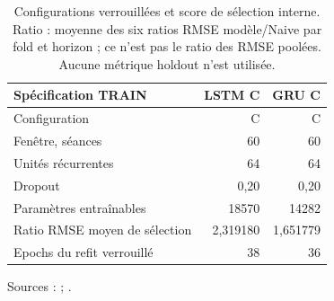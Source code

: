 \begin{table}[!htbp]
\centering
\caption{Configurations verrouillées et score de sélection interne. Ratio : moyenne des six ratios RMSE modèle/Naive par fold et horizon ; ce n'est pas le ratio des RMSE poolées. Aucune métrique holdout n'est utilisée.}
\label{tab:neural_comparison}
\small
\setlength{\tabcolsep}{4pt}
\renewcommand{\arraystretch}{1.16}
\begin{tabularx}{\linewidth}{Xrr}
\toprule
\textbf{Spécification TRAIN} & \textbf{LSTM C} & \textbf{GRU C} \\
\midrule
Configuration & C & C \\
Fenêtre, séances & 60 & 60 \\
Unités récurrentes & 64 & 64 \\
Dropout & 0,20 & 0,20 \\
Paramètres entraînables & 18570 & 14282 \\
Ratio RMSE moyen de sélection & 2,319180 & 1,651779 \\
Epochs du refit verrouillé & 38 & 36 \\
\bottomrule
\end{tabularx}
\par\smallskip
\begin{minipage}{\linewidth}\footnotesize Sources :  ; .
\end{minipage}
\end{table}
